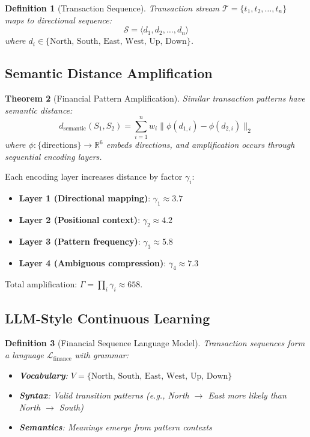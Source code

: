 \documentclass[12pt]{article}
\newtheorem{theorem}{Theorem}
\newtheorem{definition}[theorem]{Definition}
\begin{document}
\begin{definition}[Transaction Sequence]
Transaction stream $\mathcal{T} = \{t_1, t_2, \ldots, t_n\}$ maps to directional sequence:
$$
\mathcal{S} = \langle d_1, d_2, \ldots, d_n \rangle
$$
where $d_i \in \{\text{North, South, East, West, Up, Down}\}$.
\end{definition}

\subsection{Semantic Distance Amplification}

\begin{theorem}[Financial Pattern Amplification]
Similar transaction patterns have semantic distance:
$$
d_{\text{semantic}}(S_1, S_2) = \sum_{i=1}^{n} w_i \|\phi(d_{1,i}) - \phi(d_{2,i})\|_2
$$
where $\phi: \{\text{directions}\} \to \mathbb{R}^6$ embeds directions, and amplification occurs through sequential encoding layers.
\end{theorem}

Each encoding layer increases distance by factor $\gamma_i$:
\begin{itemize}
    \item \textbf{Layer 1 (Directional mapping)}: $\gamma_1 \approx 3.7$
    \item \textbf{Layer 2 (Positional context)}: $\gamma_2 \approx 4.2$
    \item \textbf{Layer 3 (Pattern frequency)}: $\gamma_3 \approx 5.8$
    \item \textbf{Layer 4 (Ambiguous compression)}: $\gamma_4 \approx 7.3$
\end{itemize}

Total amplification: $\Gamma = \prod_i \gamma_i \approx 658$.

\subsection{LLM-Style Continuous Learning}

\begin{definition}[Financial Sequence Language Model]
Transaction sequences form a language $\mathcal{L}_{\text{finance}}$ with grammar:
\begin{itemize}
    \item \textbf{Vocabulary}: $V = \{\text{North, South, East, West, Up, Down}\}$
    \item \textbf{Syntax}: Valid transition patterns (e.g., North $\to$ East more likely than North $\to$ South)
    \item \textbf{Semantics}: Meanings emerge from pattern contexts
\end{itemize}
\end{definition}
\end{document}
